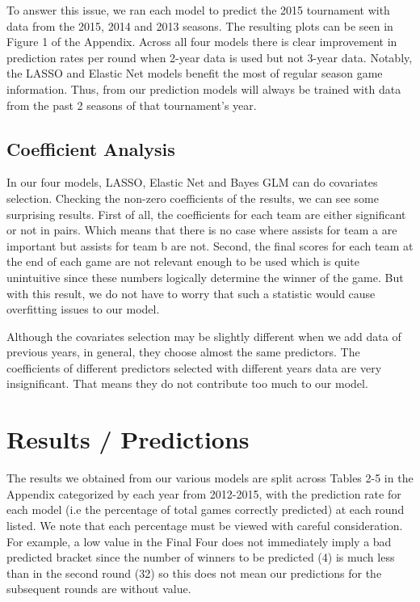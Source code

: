 \documentclass{article} %
\begin{document}
To answer this issue, we ran each model to predict the 2015 tournament with data from the 2015, 2014 and 2013 seasons. The resulting plots can be seen in Figure 1 of the Appendix. Across all four models there is clear improvement in prediction rates per round when 2-year data is used but not 3-year data. Notably, the LASSO and Elastic Net models benefit the most of regular season game information. Thus, from our prediction models will always be trained with data from the past 2 seasons of that tournament's year.

\subsection{Coefficient Analysis}

In our four models, LASSO, Elastic Net and Bayes GLM can do covariates selection. Checking the non-zero coefficients of the results, we can see some surprising results. First of all, the coefficients for each team are either significant or not in pairs. Which means that there is no case where assists for team a are important but assists for team b are not. Second, the final scores for each team at the end of each game are not relevant enough to be used which is quite unintuitive since these numbers logically determine the winner of the game. But with this result, we do not have to worry that such a statistic would cause overfitting issues to our model.\

Although the covariates selection may be slightly different when we add data of previous years, in general, they choose almost the same predictors. The coefficients of different predictors selected with different years data are very insignificant. That means they do not contribute too much to our model.\

\section{Results / Predictions}

The results we obtained from our various models are split across Tables 2-5 in the Appendix categorized by each year from 2012-2015, with the prediction rate for each model (i.e the percentage of total games correctly predicted) at each round listed. We note that each percentage must be viewed with careful consideration. For example, a low value in the Final Four does not immediately imply a bad predicted bracket since the number of winners to be predicted (4) is much less than in the second round (32) so this does not mean our predictions for the subsequent rounds are without value.
\end{document}
